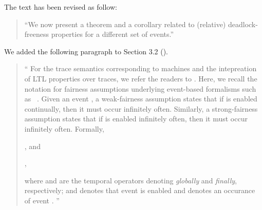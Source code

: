 \documentclass{response}
\begin{document}
\begin{comment}{Reviewer \#1}
• p. 20 typo. We are now present
\end{comment}

\begin{response}
  The text has been revised as follow:
  \begin{quote}
    ``We now present a theorem and a corollary related to (relative)
    deadlock-freeness properties for a different set of events.''
  \end{quote}
\end{response}

\begin{comment}{Reviewer \#1}
• p. 21 Could you give a formal definition or at least a reference of your 
strong fairness.
\end{comment}

\begin{response}
  We added the following paragraph to Section 3.2 (\EventB).
  \begin{quote}
    ``  For the trace semantics corresponding to \mbox{\EventB} machines and
  the intepreation of LTL properties over traces, we refer the readers
  to \mbox{\cite{hoang2016ltl}}.  Here, we recall the notation for
  fairness assumptions underlying event-based formalisms such as
  \mbox{\EventB~\cite{lamport1977proving,hudon16:_unit_b_method}}. Given
  an event \mbox{}, a weak-fairness assumption
  \mbox{} states that if \mbox{}
  is enabled continually, then it must occur infinitely often.
  Similarly, a strong-fairness assumption \mbox{}
  states that if \mbox{} is enabled infinitely often,
  then it must occur infinitely often. Formally,
\begin{center}
  , and

  ,
\end{center}
  where \mbox{} and \mbox{} are the
  temporal operators denoting \emph{globally} and \emph{finally},
  respectively; and \mbox{} denotes that
  event \mbox{} is enabled and
  \mbox{\EventBInline{[e]}} denotes an occurance of event
  \mbox{}.
   ''
  \end{quote}
\end{response}

\begin{comment}{Reviewer \#1}
• p.22 Could you comment on your definition of anticipated events. Why the set 
of convergent events is necessary to recall just before?
\end{comment}
\end{document}
